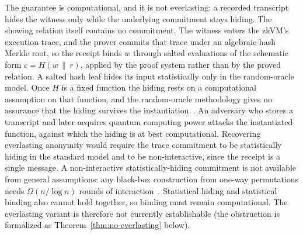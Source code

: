 \begin{remark}\label{rem:everlasting}
    The guarantee is computational, and it is not everlasting: a recorded transcript hides the witness only while the underlying commitment stays hiding. The showing relation itself contains no commitment. The witness enters the zkVM's execution trace, and the prover commits that trace under an algebraic-hash Merkle root, so the receipt binds $w$ through salted evaluations of the schematic form $c = H(w \,\|\, r)$, applied by the proof system rather than by the proved relation. A salted hash leaf hides its input statistically only in the random-oracle model. Once $H$ is a fixed function the hiding rests on a computational assumption on that function, and the random-oracle methodology gives no assurance that the hiding survives the instantiation~\cite{cgh2004rom}. An adversary who stores a transcript and later acquires quantum computing power attacks the instantiated function, against which the hiding is at best computational. Recovering everlasting anonymity would require the trace commitment to be statistically hiding in the standard model and to be non-interactive, since the receipt is a single message. A non-interactive statistically-hiding commitment is not available from general assumptions: any black-box construction from one-way permutations needs $\Omega(n/\log n)$ rounds of interaction~\cite{hhrs2007,wee2007tcc}. Statistical hiding and statistical binding also cannot hold together, so binding must remain computational. The everlasting variant is therefore not currently establishable (the obstruction is formalized as Theorem~\ref{thm:no-everlasting} below).
\end{remark}

